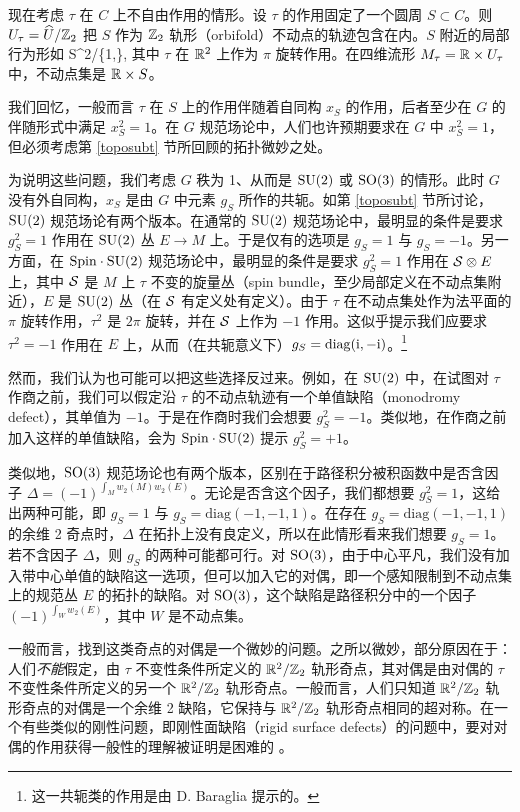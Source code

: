 现在考虑 $\tau$ 在 $C$ 上不自由作用的情形。设 $\tau$ 的作用固定了一个圆周 $S\subset C$。则 $U_\tau=\widehat U/{\mathbb Z}_2$ 把 $S$ 作为 ${\mathbb Z}_2$ 轨形（orbifold）不动点的轨迹包含在内。$S$ 附近的局部行为形如
\be\label{wofo} S\times \R^2/\{1,\tau\}, \ee
其中 $\tau$ 在 ${\mathbb R}^2$ 上作为 $\pi$ 旋转作用。在四维流形 $M_\tau={\mathbb R}\times U_\tau$ 中，不动点集是 ${\mathbb R}\times S$。

我们回忆，一般而言 $\tau$ 在 $S$ 上的作用伴随着自同构 $x_S$ 的作用，后者至少在 $G$ 的伴随形式中满足 $x_S^2=1$。在 $G$ 规范场论中，人们也许预期要求在 $G$ 中 $x_S^2=1$，但必须考虑第 \ref{toposubt} 节所回顾的拓扑微妙之处。

为说明这些问题，我们考虑 $G$ 秩为 1、从而是 ${\mathrm{SU}}(2)$ 或 ${\mathrm{SO}}(3)$ 的情形。此时 $G$ 没有外自同构，$x_S$ 是由 $G$ 中元素 $g_S$ 所作的共轭。如第 \ref{toposubt} 节所讨论，${\mathrm{SU}}(2)$ 规范场论有两个版本。在通常的 ${\mathrm{SU}}(2)$ 规范场论中，最明显的条件是要求 $g_S^2=1$ 作用在 ${\mathrm{SU}}(2)$ 丛 $E\to M$ 上。于是仅有的选项是 $g_S=1$ 与 $g_S=-1$。另一方面，在 ${\mathrm{Spin}}\cdot {\mathrm{SU}}(2)$ 规范场论中，最明显的条件是要求 $g_S^2=1$ 作用在 ${\mathcal S}\otimes E$ 上，其中 ${\mathcal S}$ 是 $M$ 上 $\tau$ 不变的旋量丛（spin bundle，至少局部定义在不动点集附近），$E$ 是 ${\mathrm{SU}}(2)$ 丛（在 ${\mathcal S}$ 有定义处有定义）。由于 $\tau$ 在不动点集处作为法平面的 $\pi$ 旋转作用，$\tau^2$ 是 $2\pi$ 旋转，并在 ${\mathcal S}$ 上作为 $-1$ 作用。这似乎提示我们应要求 $\tau^2=-1$ 作用在 $E$ 上，从而（在共轭意义下）$g_S=\mathrm{diag}({\mathrm i},-{\mathrm i})$。\footnote{这一共轭类的作用是由 D. Baraglia 提示的。}

然而，我们认为也可能可以把这些选择反过来。例如，在 ${\mathrm{SU}}(2)$ 中，在试图对 $\tau$ 作商之前，我们可以假定沿 $\tau$ 的不动点轨迹有一个单值缺陷（monodromy defect），其单值为 $-1$。于是在作商时我们会想要 $g_S^2=-1$。类似地，在作商之前加入这样的单值缺陷，会为 ${\mathrm{Spin}}\cdot {\mathrm{SU}}(2)$ 提示 $g_S^2=+1$。

类似地，${\mathrm{SO}}(3)$ 规范场论也有两个版本，区别在于路径积分被积函数中是否含因子 $\Delta=(-1)^{\int_M w_2(M) w_2(E)}$。无论是否含这个因子，我们都想要 $g_S^2=1$，这给出两种可能，即 $g_S=1$ 与 $g_S=\mathrm{diag}(-1,-1,1)$。在存在 $g_S=\mathrm{diag}(-1,-1,1)$ 的余维 2 奇点时，$\Delta$ 在拓扑上没有良定义，所以在此情形看来我们想要 $g_S=1$。若不含因子 $\Delta$，则 $g_S$ 的两种可能都可行。对 ${\mathrm{SO}}(3)$，由于中心平凡，我们没有加入带中心单值的缺陷这一选项，但可以加入它的对偶，即一个感知限制到不动点集上的规范丛 $E$ 的拓扑的缺陷。对 ${\mathrm{SO}}(3)$，这个缺陷是路径积分中的一个因子 $(-1)^{\int_W w_2(E)}$，其中 $W$ 是不动点集。

一般而言，找到这类奇点的对偶是一个微妙的问题。之所以微妙，部分原因在于：人们{\it 不能}假定，由 $\tau$ 不变性条件所定义的 ${\mathbb R}^2/{\mathbb Z}_2$ 轨形奇点，其对偶是由对偶的 $\tau$ 不变性条件所定义的另一个 ${\mathbb R}^2/{\mathbb Z}_2$ 轨形奇点。一般而言，人们只知道 ${\mathbb R}^2/{\mathbb Z}_2$ 轨形奇点的对偶是一个余维 2 缺陷，它保持与 ${\mathbb R}^2/{\mathbb Z}_2$ 轨形奇点相同的超对称。在一个有些类似的刚性问题，即刚性面缺陷（rigid surface defects）的问题中，要对对偶的作用获得一般性的理解被证明是困难的 \cite{GWr}。

